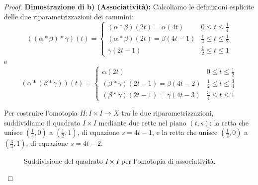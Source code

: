 \begin{proof}
\textbf{Dimostrazione di b) (Associatività):}
Calcoliamo le definizioni esplicite delle due riparametrizzazioni dei cammini:
\[
((\alpha * \beta) * \gamma)(t) = 
\begin{cases}
    (\alpha * \beta)(2t) = \alpha(4t) & 0 \leqslant t \leqslant \frac{1}{4} \\
    (\alpha * \beta)(2t) = \beta(4t-1) & \frac{1}{4} \leqslant t \leqslant \frac{1}{2} \\
    \gamma(2t-1) & \frac{1}{2} \leqslant t \leqslant 1
\end{cases}
\]
e
\[
(\alpha * (\beta * \gamma))(t) = 
\begin{cases}
    \alpha(2t) & 0 \leqslant t \leqslant \frac{1}{2} \\
    (\beta * \gamma)(2t-1) = \beta(4t-2) & \frac{1}{2} \leqslant t \leqslant \frac{3}{4} \\
    (\beta * \gamma)(2t-1) = \gamma(4t-3) & \frac{3}{4} \leqslant t \leqslant 1
\end{cases}
\]

Per costruire l'omotopia $H: I \times I \to X$ tra le due riparametrizzazioni, suddividiamo il quadrato $I \times I$ mediante due rette nel piano $(t,s)$:
la retta che unisce $(\frac{1}{4},0)$ a $(\frac{1}{2},1)$, di equazione $s = 4t-1$, e la retta che unisce $(\frac{1}{2},0)$ a $(\frac{3}{4},1)$, di equazione $s = 4t-2$.

\begin{figure}[H]
    \centering
    \caption{Suddivisione del quadrato $I \times I$ per l'omotopia di associatività.}
\end{figure}


\end{proof}
